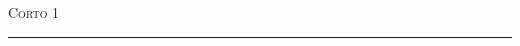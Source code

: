 \documentclass[11pt]{article}
\date{}
\newcommand{\myTitle}{Corto 1}
\theoremstyle{Tema} \newtheorem{Tema}{Tema} %
\theoremstyle{Tema} \newtheorem{Serie}{Serie}              %
\theoremstyle{Tema} \newtheorem{Ejercicio}{Ejercicio}    %
\begin{document}
\pagestyle{allStyle}

\thispagestyle{firststyle}
\begin{center}
\LARGE
\textsc{\myTitle} %
\medskip
\hrule height 1.5pt
\end{center}


\vspace{0.1 in}



\nocite{Texto}

\end{document}
